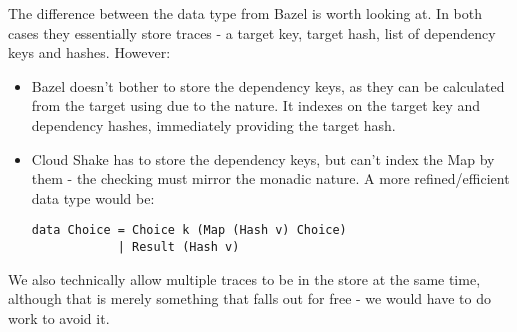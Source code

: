 The difference between the data type from Bazel is worth looking at. In both cases they essentially store traces - a target key, target hash, list of dependency keys and hashes. However:

\begin{itemize}
\item Bazel doesn't bother to store the dependency keys, as they can be calculated from the target using  due to the  nature. It indexes on the target key and dependency hashes, immediately providing the target hash.
\item Cloud Shake has to store the dependency keys, but can't index the Map by them - the checking must mirror the monadic nature. A more refined/efficient data type would be:
\begin{verbatim}
data Choice = Choice k (Map (Hash v) Choice)
            | Result (Hash v)
\end{verbatim}
\end{itemize}

We also technically allow multiple traces to be in the store at the same time, although that is merely something that falls out for free - we would have to do work to avoid it.
